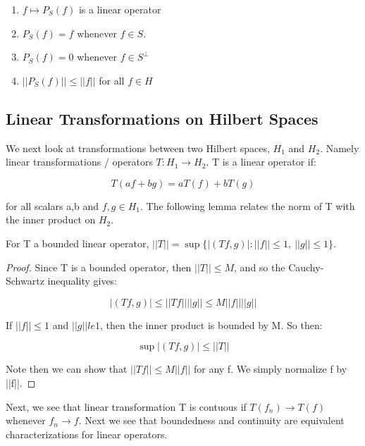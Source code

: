\documentclass[class=article, crop=false]{standalone}
\begin{document}
		\begin{enumerate}
			\item $f \mapsto P_S(f)$ is a linear operator
			\item $P_S(f) = f$ whenever $f \in S$.
			\item $P_S(f) = 0$ whenever $f \in S^\perp$
			\item $||P_S(f)|| \le ||f||$ for all $f \in H$
		\end{enumerate}


	\subsection{Linear Transformations on Hilbert Spaces}
		We next look at transformations between two Hilbert spaces, $H_1$ and $H_2$. Namely linear transformations / operators $T: H_1 \rightarrow H_2$. T is a linear operator if:

			$$T(af + bg) = aT(f) + bT(g)$$

		for all scalars a,b and $f,g \in H_1$. The following lemma relates the norm of T with the inner product on $H_2$.

		\begin{lemma}
			For T a bounded linear operator, $||T|| = \sup\{|(Tf, g)|: ||f|| \le 1,\ ||g|| \le 1 \}$.
		\end{lemma}
		\begin{proof}
			Since T is a bounded operator, then $||T|| \le M$, and so the Cauchy-Schwartz inequality gives:

				$$|(Tf, g)| \le ||Tf|| ||g|| \le M||f||||g||$$

			If $||f|| \le 1$ and $||g|| le 1$, then the inner product is bounded by M. So then:

				$$\sup |(Tf, g)| \le ||T||$$

			Note then we can show that $||Tf|| \le M ||f||$ for any f. We simply normalize f by ||f||. 
		\end{proof}

		Next, we see that linear transformation T is contuous if $T(f_n) \rightarrow T(f)$ whenever $f_n \rightarrow f$. Next we see that boundedness and continuity are equivalent characterizations for linear operators.
\end{document}
